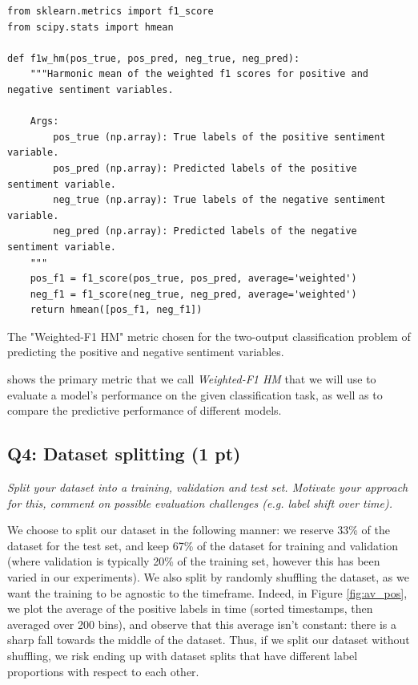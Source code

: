 \begin{listing*}[t]
\begin{verbatim}
from sklearn.metrics import f1_score
from scipy.stats import hmean

def f1w_hm(pos_true, pos_pred, neg_true, neg_pred):
    """Harmonic mean of the weighted f1 scores for positive and negative sentiment variables.

    Args:
        pos_true (np.array): True labels of the positive sentiment variable.
        pos_pred (np.array): Predicted labels of the positive sentiment variable.
        neg_true (np.array): True labels of the negative sentiment variable.
        neg_pred (np.array): Predicted labels of the negative sentiment variable.
    """
    pos_f1 = f1_score(pos_true, pos_pred, average='weighted')
    neg_f1 = f1_score(neg_true, neg_pred, average='weighted')
    return hmean([pos_f1, neg_f1])
\end{verbatim}
\caption{The "Weighted-F1 HM" metric chosen for the two-output classification problem of predicting the positive and negative sentiment variables.}
\label{listing:p1-metric}
\end{listing*}

 shows the primary metric that we call \textit{Weighted-F1 HM} that we will use to evaluate a model's performance on the given classification task, as well as to compare the predictive performance of different models.


\subsection*{Q4: Dataset splitting (1 pt)}
\textit{Split your dataset into a training, validation and test set. Motivate your approach for this, comment on possible evaluation challenges (e.g. label shift over time).}

We choose to split our dataset in the following manner: we reserve 33\% of the dataset for the test set, and keep 67\% of the dataset for training and validation (where validation is typically 20\% of the training set, however this has been varied in our experiments). We also split by randomly shuffling the dataset, as we want the training to be agnostic to the timeframe. Indeed, in Figure \ref{fig:av_pos}, we plot the average of the positive labels in time (sorted timestamps, then averaged over 200 bins), and observe that this average isn't constant: there is a sharp fall towards the middle of the dataset. Thus, if we split our dataset without shuffling, we risk ending up with dataset splits that have different label proportions with respect to each other.

